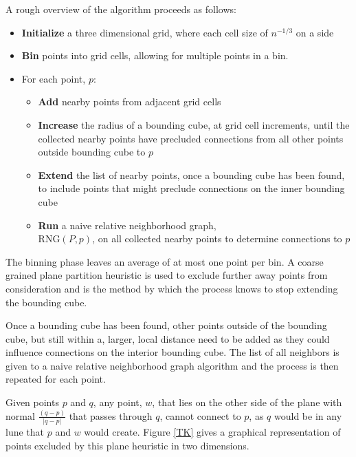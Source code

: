 \documentclass[a4paper,fleqn]{cas-dc}
\begin{document}

A rough overview of the algorithm proceeds as follows:

\begin{itemize}
  \item { \bf Initialize} a three dimensional grid, where each cell size of $n^{-1/3}$ on a side
  \item { \bf Bin} points into grid cells, allowing for multiple points in a bin.
  \item For each point, $p$:
    \begin{itemize}
      \item {\bf Add} nearby points from adjacent grid cells
      \item {\bf Increase} the radius of a bounding cube, at grid cell increments,
        until the collected nearby points have precluded connections from
        all other points outside bounding cube to $p$
      \item {\bf Extend} the list of nearby points, once a bounding cube has been
        found, to include points that might preclude connections on the inner
        bounding cube
      \item {\bf Run} a naive relative neighborhood graph, \\
        $\text{RNG}(P,p)$, on all collected nearby points
        to determine connections to $p$
    \end{itemize}
\end{itemize}

The binning phase leaves an average of at most one point per bin.
A coarse grained plane partition heuristic is used to exclude further away points from consideration
and is the method by which the process knows to stop extending the bounding cube.

Once a bounding cube has been found, other points outside of the bounding cube, but still within
a, larger, local distance need to be added as they could influence connections on the interior bounding cube.
The list of all neighbors is given to a naive relative neighborhood graph algorithm and the process is then
repeated for each point.

Given points $p$ and $q$,  any point, $w$, that lies on the other side
of the plane with normal $\frac{(q-p)}{|q - p|}$ that passes through $q$, cannot connect to $p$, as $q$ would
be in any lune that $p$ and $w$ would create.
Figure \ref{TK} gives a graphical representation of points excluded by this plane heuristic
in two dimensions.
\end{document}
